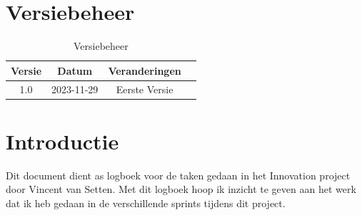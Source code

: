 \documentclass[a4paper]{report}
\begin{document}
\tableofcontents

\chapter{Versiebeheer}
\begin{table}[h]
    \centering
    \begin{tabular}{|c|c|c|p{5cm}|}
        \hline
        \textbf{Versie} & \textbf{Datum} & \textbf{Veranderingen}  \\
        \hline
        1.0   & 2023-11-29 & Eerste Versie \\
        \hline

    \end{tabular}
    \caption{Versiebeheer}
\end{table}


\chapter{Introductie}
Dit document dient as logboek voor de taken gedaan in het Innovation project door Vincent van Setten.
Met dit logboek hoop ik inzicht te geven aan het werk dat ik heb gedaan in de verschillende sprints tijdens dit project.


\vspace{1.5cm}




    
\end{document}
